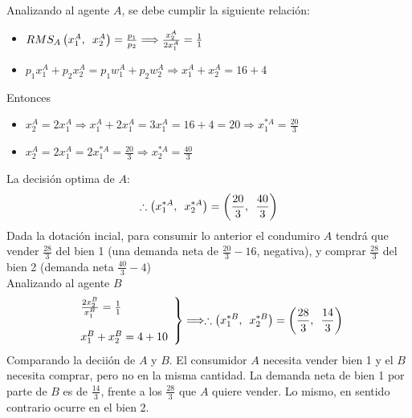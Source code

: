 Analizando al agente $A$, se debe cumplir la siguiente relación:
	\begin{itemize}
		\item $RMS_{A}\left(x_{1}^{A},\enskip x_{2}^{A} \right) = \frac{p_1}{p_2}\Longrightarrow \frac{x_{2}^{A}}{2x_{1}^{A}} = \frac{1}{1}$
		\item $p_{1}x_{1}^{A}+p_{2}x_{2}^{A} = p_{1}w_{1}^{A} + p_{2}w_{2}^{A} \Longrightarrow x_{1}^{A} + x_{2}^{A} = 16 + 4$
	\end{itemize}
Entonces 
	\begin{itemize}
		\item $x_{2}^{A}=2x_{1}^{A} \Longrightarrow  x_{1}^{A} + 2x_{1}^{A} = 3x_{1}^{A} = 16 + 4 = 20 \Longrightarrow x_{1}^{*A} = \frac{20}{3}$
		\item $x_{2}^{A}=2x_{1}^{A} = 2x_{1}^{*A} = \frac{20}{3} \Longrightarrow x_{2}^{*A} = \frac{40}{3}$
	\end{itemize}
La decisión optima de $A$:\\
	$$\therefore \left(x_{1}^{*A},\enskip x_{2}^{*A} \right) = \left(\frac{20}{3}, \enskip \frac{40}{3}\right)$$
Dada la dotación incial, para consumir lo anterior el condumiro $A$ tendrá que vender $\frac{28}{3}$ del bien 1 (una demanda neta de $\frac{20}{3} - 16$, negativa), y comprar $\frac{28}{3}$ del bien 2 (demanda neta $\frac{40}{3}-4$)\\

Analizando al agente $B$
			$$	\left.
					\begin{array}{l}
						\frac{2x_{2}^{B}}{x_{1}^{B}} = \frac{1}{1} \\ [.5cm]
						x_{1}^{B} + x_{2}^{B} = 4 + 10
					\end{array}
				\right\} \Longrightarrow \therefore \left(x_{1}^{*B},\enskip x_{2}^{*B} \right) = \left(\frac{28}{3}, \enskip \frac{14}{3}\right) $$
Comparando la deciión de $A$ y $B$. El consumidor $A$ necesita vender bien 1 y el $B$ necesita comprar, pero no en la misma cantidad. La demanda neta de bien 1 por parte de $B$ es de $\frac{14}{3}$, frente a los $\frac{28}{3}$ que $A$ quiere vender. Lo mismo, en sentido contrario ocurre en el bien 2.